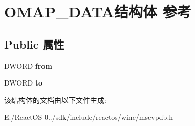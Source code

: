 \hypertarget{struct_o_m_a_p___d_a_t_a}{}\section{O\+M\+A\+P\+\_\+\+D\+A\+T\+A结构体 参考}
\label{struct_o_m_a_p___d_a_t_a}
\subsection*{Public 属性}
\begin{DoxyCompactItemize}
\item 
\mbox{\label{struct_o_m_a_p___d_a_t_a_a62be598a40a22aa90cdd5b5d40111e9b}} 
D\+W\+O\+RD {\bfseries from}
\item 
\mbox{\label{struct_o_m_a_p___d_a_t_a_a7b5df2f7f2b3115a239a7d758a169960}} 
D\+W\+O\+RD {\bfseries to}
\end{DoxyCompactItemize}


该结构体的文档由以下文件生成\+:\begin{DoxyCompactItemize}
\item 
E\+:/\+React\+O\+S-\/0../sdk/include/reactos/wine/mscvpdb.\+h\end{DoxyCompactItemize}
